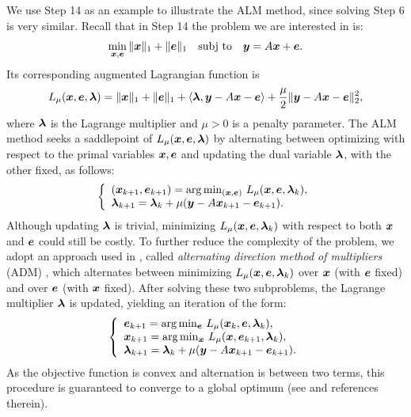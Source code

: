 \documentclass[12pt,journal,draftcls,letterpaper,onecolumn]{IEEEtran}
\newcommand{\subj}{\textup{subj to}}
\begin{document}
We use Step 14 as an example to illustrate the ALM
method, since solving Step 6 is very similar. Recall that in
Step 14 the problem we are interested in is:
\begin{equation}
\min_{\x, \e} \| \x \|_1 + \|\e\|_1 \quad \subj \quad \y =
A \x + \e.
\end{equation}
Its corresponding augmented Lagrangian function is
\begin{equation}
L_\mu ({\boldsymbol{x}},\boldsymbol{e},\boldsymbol{\lambda}) = \|{\boldsymbol{x}}\|_1 + \|\boldsymbol{e}\|_1 + \langle \boldsymbol{\lambda}, {\boldsymbol{y}}-A{\boldsymbol{x}} - \boldsymbol{e} \rangle + \frac{\mu}{2} \|{\boldsymbol{y}} - A{\boldsymbol{x}} - \boldsymbol{e}\|_2^2,
\end{equation}
where $\boldsymbol{\lambda}$ is the Lagrange multiplier and $\mu > 0$ is a
penalty parameter. The ALM method seeks a saddlepoint of $L_\mu
({\boldsymbol{x}},\boldsymbol{e},\boldsymbol{\lambda})$ by alternating between optimizing with respect
to the primal variables ${\boldsymbol{x}}, \boldsymbol{e}$ and updating the dual variable
$\boldsymbol{\lambda}$, with the other fixed, as follows:
\begin{equation}
\left \{
\begin{array}{lll}
(\x_{k+1},\e_{k+1})  =  \arg\min_{(\x,\e)} \, L_{\mu} (\x,\e,\blamda_k),\\
\blamda_{k+1}  =  \blamda_k + \mu (\y - A\x_{k+1} - \e_{k+1}). \\
\end{array}
\right .
\label{eq:alm}
\end{equation}
Although updating $\boldsymbol{\lambda}$ is trivial,
minimizing $L_{\mu} ({\boldsymbol{x}},\boldsymbol{e},\boldsymbol{\lambda}_k)$ with respect to both
${\boldsymbol{x}}$ and $\boldsymbol{e}$ could still be costly. To further reduce the
complexity of the problem, we adopt an approach used in
\cite{YangJ2009-pp}, called \emph{alternating direction
method of multipliers} (ADM) \cite{Glowinski1975-TR}, which alternates between minimizing $L_{\mu} ({\boldsymbol{x}},\boldsymbol{e},\boldsymbol{\lambda}_k)$
over ${\boldsymbol{x}}$ (with $\boldsymbol{e}$ fixed) and over $\boldsymbol{e}$ (with ${\boldsymbol{x}}$ fixed). After solving these two subproblems, the Lagrange multiplier $\boldsymbol{\lambda}$ is updated, yielding an iteration of the form:
\begin{equation}
\left \{
\begin{array}{lll}
\e_{k+1}  =  \arg\min_{\e} \, L_{\mu} (\x_k,\e,\blamda_k),\\
\x_{k+1}  =  \arg\min_{\x} \, L_{\mu} (\x,\e_{k+1},\blamda_k),\\
\blamda_{k+1}  =  \blamda_k + \mu (\y - A\x_{k+1} - \e_{k+1}). \\
\end{array}
\right .
\label{eq:adm}
\end{equation}
As the objective function is convex and alternation is between two
terms, this procedure is guaranteed to converge to a global optimum (see \cite{YangJ2009-pp} and references therein). 
\end{document}
